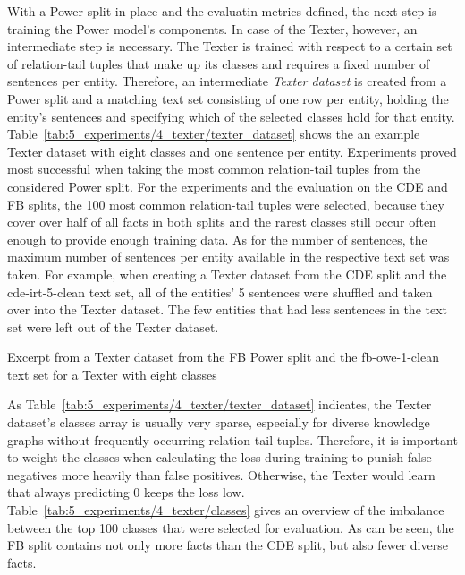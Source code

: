 With a Power split in place and the evaluatin metrics defined, the next step is training the Power model's components. In case of the Texter, however, an intermediate step is necessary. The Texter is trained with respect to a certain set of relation-tail tuples that make up its classes and requires a fixed number of sentences per entity. Therefore, an intermediate \emph{Texter dataset} is created from a Power split and a matching text set consisting of one row per entity, holding the entity's sentences and specifying which of the selected classes hold for that entity. Table~\ref{tab:5_experiments/4_texter/texter_dataset} shows the an example Texter dataset with eight classes and one sentence per entity. Experiments proved most successful when taking the most common relation-tail tuples from the considered Power split. For the experiments and the evaluation on the CDE and FB splits, the 100 most common relation-tail tuples were selected, because they cover over half of all facts in both splits and the rarest classes still occur often enough to provide enough training data. As for the number of sentences, the maximum number of sentences per entity available in the respective text set was taken. For example, when creating a Texter dataset from the CDE split and the cde-irt-5-clean text set, all of the entities' 5 sentences were shuffled and taken over into the Texter dataset. The few entities that had less sentences in the text set were left out of the Texter dataset.

\begin{table}
    \centering
    
    \caption{Excerpt from a Texter dataset from the FB Power split and the fb-owe-1-clean text set for a Texter with eight classes}
    \label{tab:5_experiments/4_texter/texter_dataset}
\end{table}

As Table~\ref{tab:5_experiments/4_texter/texter_dataset} indicates, the Texter dataset's classes array is usually very sparse, especially for diverse knowledge graphs without frequently occurring relation-tail tuples. Therefore, it is important to weight the classes when calculating the loss during training to punish false negatives more heavily than false positives. Otherwise, the Texter would learn that always predicting 0 keeps the loss low. Table~\ref{tab:5_experiments/4_texter/classes} gives an overview of the imbalance between the top 100 classes that were selected for evaluation. As can be seen, the FB split contains not only more facts than the CDE split, but also fewer diverse facts.

